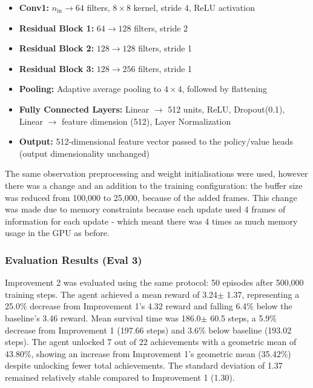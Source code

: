 \documentclass[twocolumn]{article}
\begin{document}
\begin{itemize}
	\item \textbf{Conv1:} $n_\text{in} \rightarrow 64$ filters, $8 \times 8$ kernel, stride 4, ReLU activation
	\item \textbf{Residual Block 1:} $64 \rightarrow 128$ filters, stride 2
	\item \textbf{Residual Block 2:} $128 \rightarrow 128$ filters, stride 1
	\item \textbf{Residual Block 3:} $128 \rightarrow 256$ filters, stride 1
	\item \textbf{Pooling:} Adaptive average pooling to $4 \times 4$, followed by flattening
	\item \textbf{Fully Connected Layers:} Linear $\rightarrow$ 512 units, ReLU, Dropout(0.1), Linear $\rightarrow$ feature dimension (512), Layer Normalization
	\item \textbf{Output:} 512-dimensional feature vector passed to the policy/value heads (output dimensionality unchanged)
\end{itemize}

The same observation preprocessing and weight initialisations were used, however there was a change and an addition to the training configuration: the buffer size was reduced from 100,000 to 25,000, because of the added frames. This change was made due to memory constraints because each update used 4 frames of information for each update - which meant there was 4 times as much memory usage in the GPU as before. 

\subsubsection*{Evaluation Results (Eval 3)}

Improvement 2 was evaluated using the same protocol: 50 episodes after 500,000 training steps. The agent achieved a mean reward of 3.24$\pm$ 1.37, representing a
25.0\% decrease from Improvement 1's 4.32 reward and falling 6.4\% below the baseline's 3.46 reward. Mean survival time was 186.0$\pm$ 60.5 steps, a
5.9\% decrease from Improvement 1 (197.66 steps) and 3.6\% below baseline (193.02 steps). The agent unlocked 7 out of 22 achievements with a geometric mean of 43.80\%, showing an increase from Improvement 1's geometric mean (35.42\%) despite unlocking fewer total achievements. The standard deviation of 1.37 remained relatively stable compared to Improvement 1 (1.30).
\end{document}
